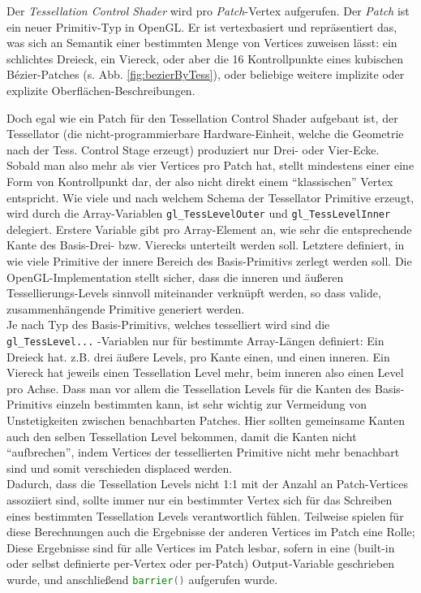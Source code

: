 	Der \emph{Tessellation Control Shader} wird pro \emph{Patch}-Vertex aufgerufen. Der \emph{Patch}
	ist ein neuer Primitiv-Typ in OpenGL. Er ist vertexbasiert und repräsentiert das, was sich
	an Semantik einer bestimmten Menge von Vertices zuweisen lässt: ein schlichtes Dreieck, ein Viereck,
	oder aber die 16 Kontrollpunkte eines kubischen Bézier-Patches (s. Abb. \ref{fig:bezierByTess}), oder beliebige 
	weitere implizite oder explizite Oberflächen-Beschreibungen.

	
	Doch egal wie ein Patch für den Tessellation Control Shader aufgebaut ist, der Tessellator
	(die nicht-programmierbare Hardware-Einheit, welche die Geometrie nach der Tess. Control Stage
	erzeugt) produziert nur Drei- oder Vier-Ecke. Sobald man also mehr als vier Vertices pro Patch hat,
	stellt mindestens einer eine Form von Kontrollpunkt dar, der also nicht direkt einem "`klassischen"'
	Vertex entspricht.
	Wie viele und nach welchem Schema der Tessellator Primitive erzeugt, wird durch die
	Array-Variablen \lstinline|gl_TessLevelOuter| und \lstinline|gl_TessLevelInner| delegiert.
	Erstere Variable gibt pro Array-Element an, wie sehr die entsprechende Kante des Basis-Drei- bzw.
	Vierecks unterteilt werden soll. Letztere definiert, in wie viele Primitive der innere Bereich des
	Basis-Primitivs zerlegt werden soll. Die OpenGL-Implementation stellt sicher, dass die inneren und äußeren
	Tessellierungs-Levels sinnvoll miteinander verknüpft werden, so dass valide, zusammenhängende
	Primitive generiert werden. \\
	Je nach Typ des Basis-Primitivs, welches tesselliert wird sind die \lstinline|gl_TessLevel...| -Variablen
	nur für bestimmte Array-Längen definiert: Ein Dreieck hat. z.B. drei äußere Levels, pro Kante einen,
	und einen inneren. Ein Viereck hat jeweils einen Tessellation Level mehr, beim inneren also einen Level pro Achse.
	Dass man vor allem die Tessellation Levels für die Kanten des Basis-Primitivs einzeln bestimmten kann,
	ist sehr wichtig zur Vermeidung von  Unstetigkeiten zwischen benachbarten Patches. Hier sollten gemeinsame Kanten
	auch den selben Tessellation Level bekommen, damit die Kanten nicht "`aufbrechen"', indem Vertices der tessellierten
	Primitive nicht mehr benachbart sind und somit verschieden displaced werden.\\
	Dadurch, dass die Tessellation Levels nicht 1:1 mit der Anzahl an Patch-Vertices assoziiert sind, sollte immer nur
	ein bestimmter Vertex sich für das Schreiben eines bestimmten Tessellation Levels verantwortlich fühlen.
	Teilweise spielen für diese Berechnungen auch die Ergebnisse der anderen Vertices im Patch eine Rolle;
	Diese Ergebnisse sind für alle Vertices im Patch lesbar, sofern in eine (built-in oder selbst definierte
	per-Vertex oder per-Patch)	Output-Variable geschrieben wurde, und anschließend 
	\lstinline[language=GLSL]|barrier()| aufgerufen wurde.
	
